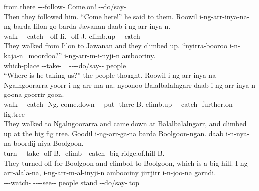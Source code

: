 \begin{exye}
from.there ---follow- Come.on! --do/say-=\\
\ft Then they followed him. ``Come here!'' he said to them.
\exy {}
\gll Roowil i-ng-arr-inya-na-ng barda Iilon-go barda Jawanan daab i-ng-arr-inya-n.\\
walk ---catch-- off Ii.- off J. climb.up ---catch-\\
\ft They walked from Iilon to Jawanan and they climbed up.
\newpage\exy {}
\gll ``nyirra-booroo i-n-kaja-n=moordoo?'' i-ng-arr-m-i-nyji-n ambooriny.\\
which-place --take-= ----do/say-- people\\
\ft ``Where is he taking us?'' the people thought.
\exy {}
\gll Roowil i-ng-arr-inya-na Ngalngoorarra yoorr i-ng-arr-ma-na. nyoonoo Balalbalalngarr daab i-ng-arr-inya-n goona goorrir-goon.\\
walk ---catch- Ng. come.down ---put- there B. climb.up ---catch- further.on fig.tree-\\
\ft They walked to Ngalngoorarra and came down at Balalbalalngarr, and climbed up at the big fig tree.
\exy {}
\gll Goodil i-ng-arr-ga-na barda Boolgoon-ngan. daab i-n-nya-na boordij niya Boolgoon.\\
turn ---take- off B.- climb --catch- big ridge.of.hill B.\\
\ft They turned off for Boolgoon and climbed to Boolgoon, which is a big hill.
\exy {}
\gll I-ng-arr-alala-na, i-ng-arr-m-al-inyji-n ambooriny jirrjirr i-n-joo-na garndi.\\
---watch- ----see-- people stand --do/say- top\\

\end{exye}
